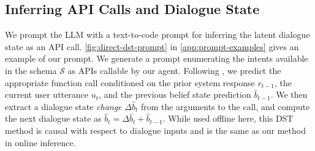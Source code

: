 \documentclass[11pt]{article}
\newcommand{\schema}[0]{\mathcal{S}}
\newcommand{\dstcolor}[1]{\textcolor{dst-color}{#1}}
\begin{document}

\subsection{Inferring API Calls and Dialogue State}
\label{sec:methods-dst}

We prompt the LLM with a text-to-code prompt for inferring the latent dialogue state as an API call.
\autoref{fig:direct-dst-prompt} in \autoref{app:prompt-examples} gives an example of our prompt.
We generate a prompt enumerating the intents available in the schema $\schema$ as APIs callable by our agent.
Following \citet{hu_-context_2022}, we predict the appropriate function call conditioned on the prior system response $r_{t-1}$, the current user utterance $u_t$, and the previous belief state prediction $\hat{b}_{t-1}$. 
We then extract a dialogue state \textit{change} $\Delta \hat{b}_t$ from the arguments to the call, and compute the next dialogue state as $\hat{b}_t = \Delta \hat{b}_t + \hat{b}_{t-1}$.
While used offline here, this DST method is causal with respect to dialogue inputs and is the same as our method in online inference.
\end{document}
